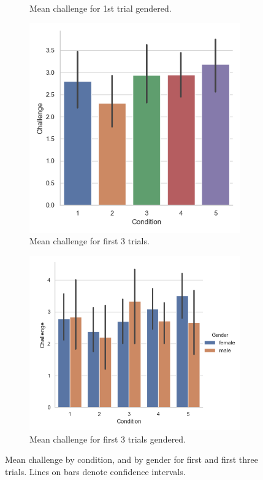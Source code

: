 \begin{figure}[H]
\begin{subfigure}[b]{0.5\textwidth}
     \caption{Mean challenge for 1st trial gendered.}
     \label{fig:meanChalGen1st}
 \end{subfigure}
  \begin{subfigure}[b]{0.5\textwidth}
     \centering
     \includegraphics[scale=0.5]{Files/Plots/challenge_first_3_trials.png}
     \caption{Mean challenge for first 3 trials.}
     \label{fig:meanChal3rd}
 \end{subfigure}
     \begin{subfigure}[b]{0.5\textwidth}
     \centering
     \includegraphics[scale=0.5]{Files/Plots/challenge_first_3_trials_gen.png}
     \caption{Mean challenge for first 3 trials gendered.}
     \label{fig:meanChalGen3rd}
 \end{subfigure}
     \caption{Mean challenge by condition, and by gender for first and first three trials. Lines on bars denote confidence intervals.}
    \label{fig:Chal1st3rd}
\end{figure}

